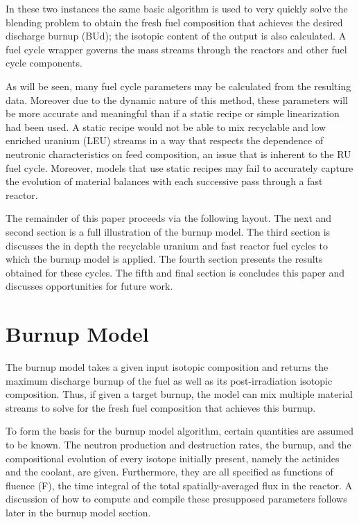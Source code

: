 In these two instances the same basic algorithm is used to very quickly solve the blending problem to obtain the fresh fuel composition that achieves the desired discharge burnup (BUd); the isotopic content of the output is also calculated.   A fuel cycle wrapper governs the mass streams through the reactors and other fuel cycle components.  

As will be seen, many fuel cycle parameters may be calculated from the resulting data.  Moreover due to the dynamic nature of this method, these parameters will be more accurate and meaningful than if a static recipe or simple linearization had been used.  A static recipe would not be able to mix recyclable and low enriched uranium (LEU) streams in a way that respects the dependence of neutronic characteristics on feed composition, an issue that is inherent to the RU fuel cycle.  Moreover, models that use static recipes may fail to accurately capture the evolution of material balances with each successive pass through a fast reactor.   

The remainder of this paper proceeds via the following layout. The next and second section is a full illustration of the burnup model.  The third section is discusses the in depth the recyclable uranium and fast reactor fuel cycles to which the burnup model is applied.  The fourth section presents the results obtained for these cycles.  The fifth and final section is concludes this paper and discusses opportunities for future work. 


\section{Burnup Model}
\label{1g_sec:bu_model}
The burnup model takes a given input isotopic composition and returns the maximum discharge burnup of the fuel as well as its post-irradiation isotopic composition.  Thus, if given a target burnup, the model can mix multiple material streams to solve for the fresh fuel composition that achieves this burnup.

To form the basis for the burnup model algorithm, certain quantities are assumed to be known.  The neutron production and destruction rates, the burnup, and the compositional evolution of every isotope initially present, namely the actinides and the coolant, are given.  Furthermore, they are all specified as functions of fluence (F), the time integral of the total spatially-averaged flux in the reactor. A discussion of how to compute and compile these presupposed parameters follows later in the burnup model section. 


